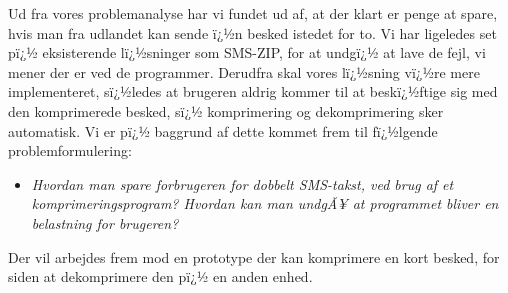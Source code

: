 Ud fra vores problemanalyse har vi fundet ud af, at der klart er penge at spare, hvis man fra udlandet kan sende ï¿½n besked istedet for to. Vi har ligeledes set pï¿½ eksisterende lï¿½sninger som SMS-ZIP, for at undgï¿½ at lave de fejl, vi mener der er ved de programmer. Derudfra skal vores lï¿½sning vï¿½re mere implementeret, sï¿½ledes at brugeren aldrig kommer til at beskï¿½ftige sig med den komprimerede besked, sï¿½ komprimering og dekomprimering sker automatisk. Vi er pï¿½ baggrund af dette kommet frem til fï¿½lgende problemformulering:

\begin{itemize}
\item[] \emph{Hvordan man spare forbrugeren for dobbelt SMS-takst, ved brug af et komprimeringsprogram? Hvordan kan man undgÃ¥ at programmet bliver en belastning for brugeren?}
\end{itemize}

Der vil arbejdes frem mod en prototype der kan komprimere en kort besked, for siden at dekomprimere den pï¿½ en anden enhed. 